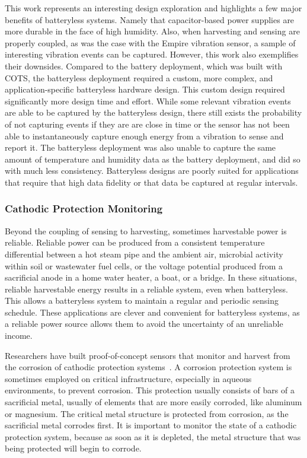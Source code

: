This work represents an interesting design exploration and highlights a few major benefits of batteryless systems. Namely that capacitor-based power supplies are more durable in the face of high humidity. Also, when harvesting and sensing are properly coupled, as was the case with the Empire vibration sensor, a sample of interesting vibration events can be captured. 
However, this work also exemplifies their downsides.
Compared to the battery deployment, which was built with COTS, the batteryless deployment required a custom, more complex, and application-specific batteryless hardware design. 
This custom design required significantly more design time and effort.
While some relevant vibration events are able to be captured by the batteryless design, there still exists the probability of not capturing events if they are are close in time or the sensor has not been able to instantaneously capture enough energy from a vibration to sense and report it.
The batteryless deployment was also unable to capture the same amount of temperature and humidity data as the battery deployment, and did so with much less consistency.
Batteryless designs are poorly suited for applications that require that high data fidelity or that data be captured at regular intervals. 

\subsubsection{Cathodic Protection Monitoring}
Beyond the coupling of sensing to harvesting, sometimes harvestable power is reliable.
Reliable power can be produced from a consistent temperature differential between a hot steam pipe and the ambient air, microbial activity within soil or wastewater fuel cells, or the voltage potential produced from a sacrificial anode in a home water heater, a boat, or a bridge.
In these situations, reliable harvestable energy results in a reliable system, even when batteryless.
This allows a batteryless system to maintain a regular and periodic sensing schedule.
These applications are clever and convenient for batteryless systems, as a reliable power source allows them to avoid the uncertainty of an unreliable income.

Researchers have built proof-of-concept sensors that monitor and harvest from the corrosion of cathodic protection systems~\cite{jagtap2021repurposing}.
A corrosion protection system is sometimes employed on critical infrastructure, especially in aqueous environments, to prevent corrosion.
This protection usually consists of bars of a sacrificial metal, usually of elements that are more easily corroded, like aluminum or magnesium.
The critical metal structure is protected from corrosion, as the sacrificial metal corrodes first.
It is important to monitor the state of a cathodic protection system, because as soon as it is depleted, the metal structure that was being protected will begin to corrode.

